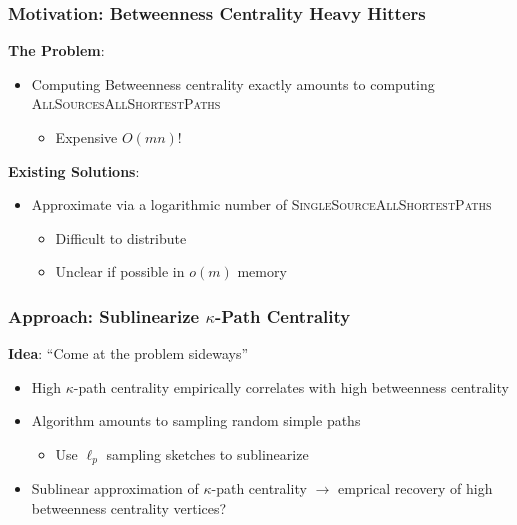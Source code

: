 \documentclass{beamer}
\newcommand{\algoname}[1]{\textnormal{\textsc{#1}}}
\begin{document}
\begin{frame}
\frametitle{Motivation: Betweenness Centrality Heavy Hitters}

\textbf{The Problem}:
\begin{itemize}
	\item Computing Betweenness centrality exactly amounts to computing \algoname{AllSourcesAllShortestPaths}
	\begin{itemize}
		\item Expensive $O(mn)$!
	\end{itemize}
\end{itemize}
\textbf{Existing Solutions}:
\begin{itemize}
	\item Approximate via a logarithmic number of \algoname{SingleSourceAllShortestPaths} \cite{green2012fast, bergamini2014approximating, yoshida2014almost, kourtellis2015scalable, riondato2016fast}
	\begin{itemize}
		\item Difficult to distribute
		\item Unclear if possible in $o(m)$ memory
	\end{itemize}
\end{itemize}


\end{frame}




\begin{frame}
\frametitle{Approach: Sublinearize $\kappa$-Path Centrality}

\textbf{Idea}: ``Come at the problem sideways''
\begin{itemize}
	\item High $\kappa$-path centrality empirically correlates with high betweenness centrality \cite{kourtellis2013identifying}%
	\item Algorithm amounts to sampling random simple paths
	\begin{itemize}
		\item Use $\ell_p$ sampling sketches to sublinearize
	\end{itemize}
	\item Sublinear approximation of $\kappa$-path centrality $\rightarrow$ emprical recovery of high betweenness centrality vertices?
\end{itemize}

\begin{dynblock}
\end{dynblock}


\end{frame}
\end{document}
